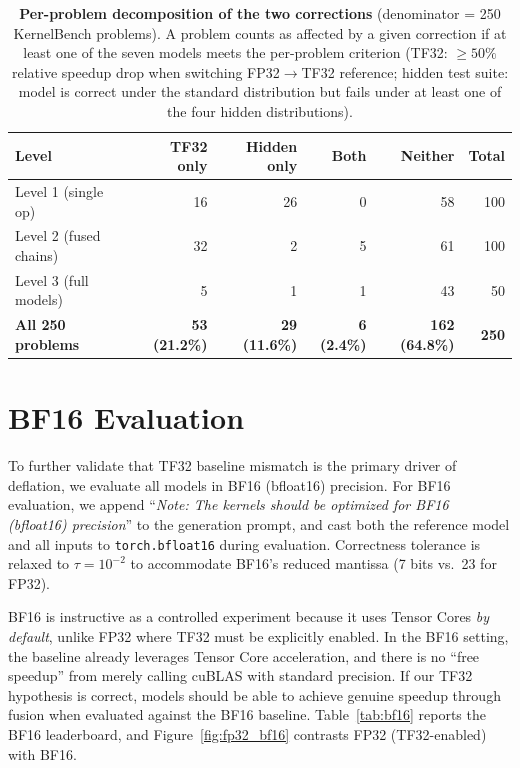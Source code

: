 \documentclass[11pt]{article}
\begin{document}
\begin{table}[H]
\centering
\caption{\textbf{Per-problem decomposition of the two corrections} (denominator = 250 KernelBench problems). A problem counts as affected by a given correction if at least one of the seven models meets the per-problem criterion (TF32: $\ge 50\%$ relative speedup drop when switching FP32$\to$TF32 reference; hidden test suite: model is correct under the standard distribution but fails under at least one of the four hidden distributions).}
\label{tab:perproblem-decomp}\small
\begin{tabular}{l rrrr r}
\toprule
\textbf{Level} & TF32 only & Hidden only & Both & Neither & Total \\
\midrule
Level 1 (single op)        & 16 & 26 & 0 & 58 & 100 \\
Level 2 (fused chains)     & 32 &  2 & 5 & 61 & 100 \\
Level 3 (full models)      &  5 &  1 & 1 & 43 &  50 \\
\midrule
\textbf{All 250 problems}  & \textbf{53 (21.2\%)} & \textbf{29 (11.6\%)} & \textbf{6 (2.4\%)} & \textbf{162 (64.8\%)} & \textbf{250} \\
\bottomrule
\end{tabular}
\end{table}

\section{BF16 Evaluation}
\label{app:bf16}

To further validate that TF32 baseline mismatch is the primary driver of deflation, we evaluate all models in BF16 (bfloat16) precision. For BF16 evaluation, we append ``\textit{Note: The kernels should be optimized for BF16 (bfloat16) precision}'' to the generation prompt, and cast both the reference model and all inputs to \texttt{torch.bfloat16} during evaluation. Correctness tolerance is relaxed to $\tau=10^{-2}$ to accommodate BF16's reduced mantissa (7 bits vs.\ 23 for FP32).

BF16 is instructive as a controlled experiment because it uses Tensor Cores \emph{by default}, unlike FP32 where TF32 must be explicitly enabled. In the BF16 setting, the baseline already leverages Tensor Core acceleration, and there is no ``free speedup'' from merely calling cuBLAS with standard precision. If our TF32 hypothesis is correct, models should be able to achieve genuine speedup through fusion when evaluated against the BF16 baseline. Table~\ref{tab:bf16} reports the BF16 leaderboard, and Figure~\ref{fig:fp32_bf16} contrasts FP32 (TF32-enabled) with BF16.
\end{document}
